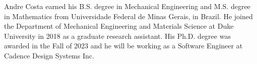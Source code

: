 \biography

Andre Costa earned his B.S. degree in Mechanical Engineering and M.S. degree in Mathematics from Universidade Federal de Minas Gerais, in Brazil. He joined the Department of 
Mechanical Engineering and Materials Science at Duke University in 
2018 as a graduate research assistant. His Ph.D. degree was awarded in the Fall of 2023 and he will be working as a Software Engineer at Cadence Design Systems Inc.
